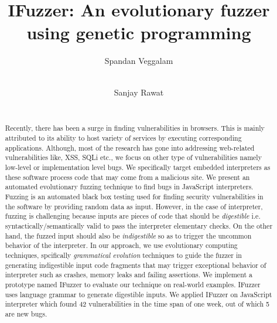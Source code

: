 \documentclass{acm_proc_article-sp}
\begin{document}

\title{IFuzzer: An evolutionary fuzzer using genetic programming}
\author{
\alignauthor
Spandan Veggalam\\
       \\
\and
\alignauthor
Sanjay Rawat\\
       \\
}
\maketitle

\begin{abstract}
Recently, there has been a surge in finding vulnerabilities in browsers. This is mainly attributed to its ability to host variety of services by executing corresponding applications. Although, most of the research has gone into addressing web-related vulnerabilities like, XSS, SQLi etc., we focus on other type of vulnerabilities namely low-level or implementation level bugs. We specifically target embedded interpreters as these software process code that may come from a malicious site. We present an automated evolutionary fuzzing technique to find bugs in JavaScript interpreters. Fuzzing is an automated black box testing used for finding security vulnerabilities in the software by providing random data as input. However, in the case of interpreter, fuzzing is challenging because inputs are pieces of code that should be \emph{digestible} i.e. syntactically/semantically valid to pass the interpreter elementary checks. On the other hand, the fuzzed input should also be \emph{indigestible} so as to trigger the uncommon behavior of the interpreter. In our approach, we use evolutionary computing techniques, spcifically \emph{grammatical evolution} techniques to guide the fuzzer in generating indigestible input code fragments that may trigger exceptional behavior of interpreter such as crashes, memory leaks and failing assertions. We implement a prototype named IFuzzer to evaluate our technique on real-world examples. IFuzzer uses language grammar to generate digestible inputs. We applied IFuzzer on JavaScript interpreter which found 42 vulnerabilities in the time span of one week, out of which 5 are new bugs.
\end{abstract}
\end{document}
